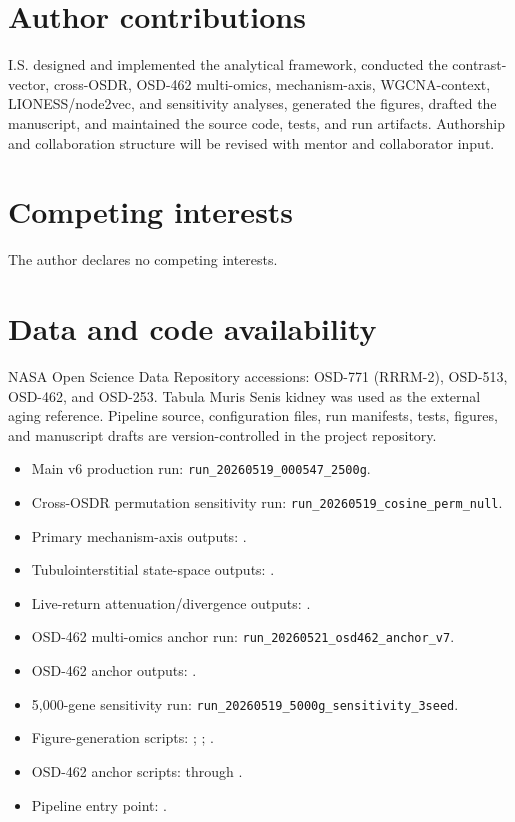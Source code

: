 \documentclass[11pt]{article}
\newcommand{\code}[1]{\texttt{#1}}
\begin{document}
\section*{Author contributions}
I.S. designed and implemented the analytical framework, conducted the contrast-vector, cross-OSDR, OSD-462 multi-omics, mechanism-axis, WGCNA-context, LIONESS/node2vec, and sensitivity analyses, generated the figures, drafted the manuscript, and maintained the source code, tests, and run artifacts. Authorship and collaboration structure will be revised with mentor and collaborator input.

\section*{Competing interests}
The author declares no competing interests.

\section*{Data and code availability}
NASA Open Science Data Repository accessions: OSD-771 (RRRM-2), OSD-513, OSD-462, and OSD-253. Tabula Muris Senis kidney was used as the external aging reference. Pipeline source, configuration files, run manifests, tests, figures, and manuscript drafts are version-controlled in the project repository.

\begin{itemize}
  \item Main v6 production run: \code{run\_20260519\_000547\_2500g}.
  \item Cross-OSDR permutation sensitivity run: \code{run\_20260519\_cosine\_perm\_null}.
  \item Primary mechanism-axis outputs: .
  \item Tubulointerstitial state-space outputs: .
  \item Live-return attenuation/divergence outputs: .
  \item OSD-462 multi-omics anchor run: \code{run\_20260521\_osd462\_anchor\_v7}.
  \item OSD-462 anchor outputs: .
  \item 5,000-gene sensitivity run: \code{run\_20260519\_5000g\_sensitivity\_3seed}.
  \item Figure-generation scripts: ; ; .
  \item OSD-462 anchor scripts:  through .
  \item Pipeline entry point: .
\end{itemize}
\end{document}
